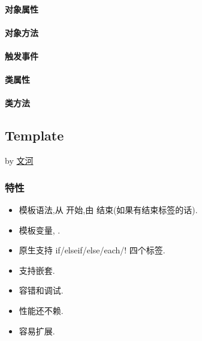 \documentclass[letterpaper,10pt,english]{sphinxmanual}
\begin{document}
\paragraph{对象属性}
\label{api/component/suggest/suggest:id2}

\paragraph{对象方法}
\label{api/component/suggest/suggest:id3}

\paragraph{触发事件}
\label{api/component/suggest/suggest:id4}

\paragraph{类属性}
\label{api/component/suggest/suggest:id5}

\paragraph{类方法}
\label{api/component/suggest/suggest:id6}\label{api/component/template/index:module-Template}

\subsection{Template}
\label{api/component/template/index::doc}\label{api/component/template/index:template}
by \href{mailto:wenhe@taobao.com}{文河}


\subsubsection{特性}
\label{api/component/template/index:id2}\begin{itemize}
\item {}
模板语法,从  开始,由  结束(如果有结束标签的话).

\item {}
模板变量,  .

\item {}
原生支持 if/elseif/else/each/! 四个标签.

\item {}
支持嵌套.

\item {}
容错和调试.

\item {}
性能还不赖.

\item {}
容易扩展.

\end{itemize}
\end{document}

